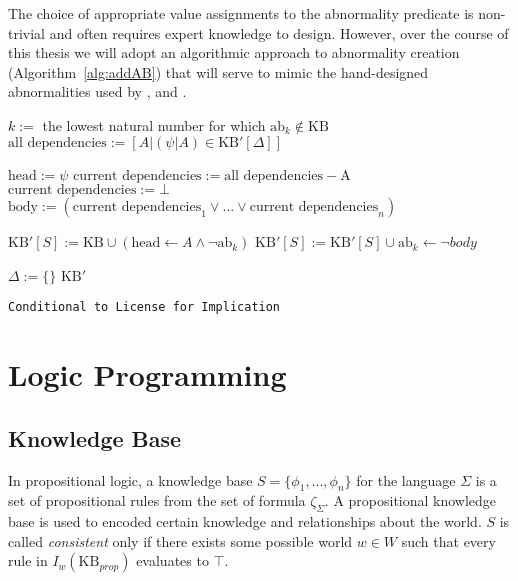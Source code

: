 The choice of appropriate value assignments to the abnormality predicate is non-trivial and often requires expert knowledge to design. However, over the course of this thesis we will adopt an algorithmic approach to abnormality creation (Algorithm~\ref{alg:addAB}) that will serve to mimic the hand-designed abnormalities used by \cite{dietz2012computational}, and \cite{breu2019weak}.


\begin{algorithm}[H] 
\SetAlgoLined
{}
{
{
$k:=$ the lowest natural number for which $\text{ab}_k \notin \text{KB}$\;
$\text{all dependencies}:= [A | (\psi|A) \in \text{KB}'[\Delta]]$\;

{
$\text{head}:=\psi$\;
$\text{current dependencies}:= \text{all dependencies} - \text{A}$\;
{
$\text{current dependencies}:=\bot$\;
}
$\text{body}:=(\text{current dependencies}_1 \lor ... \lor \text{current dependencies}_n)$\;

$\text{KB}'[S]:= \text{KB} \cup (\text{head} \leftarrow A \land \lnot \text{ab}_k)$\;
$\text{KB}'[S]:= \text{KB}'[S] \cup \text{ab}_k \leftarrow \lnot body$\;

}
}
$\Delta:=\{\}$\;
\Return $\text{KB}'$
}
\caption{\texttt{Conditional to License for Implication}}
\label{alg:addAB}
\end{algorithm}







\section{Logic Programming}
\subsection{Knowledge Base} \label{ssec:kb}
In propositional logic, a knowledge base $S=\{\phi_1,...,\phi_n\}$ for the language $\Sigma$ is a set of propositional rules from the set of formula $\zeta_\Sigma$. A propositional knowledge base is used to encoded certain knowledge and relationships about the world. $S$ is called \textit{consistent} only if there exists some possible world $w \in W$ such that every rule in $I_w(\text{KB}_{prop})$ evaluates to $\top$.

